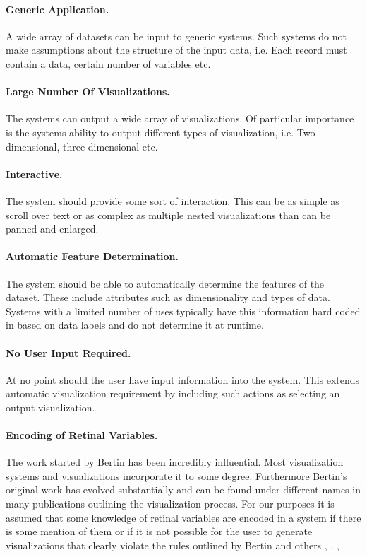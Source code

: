 \documentclass[a4paper, 11pt, titlepage, onehalfspacing]{report}
\begin{document}
\paragraph{Generic Application.} A wide array of datasets can be input to generic systems. Such systems do not make assumptions about the structure of the input data, i.e. Each record must contain a data, certain number of variables etc.

\paragraph{Large Number Of Visualizations.} The systems can output a wide array of visualizations. Of particular importance is the systems ability to output different types of visualization, i.e. Two dimensional, three dimensional etc.

\paragraph{Interactive.} The system should provide some sort of interaction. This can be as simple as scroll over text or as complex as multiple nested visualizations than can be panned and enlarged. 

\paragraph{Automatic Feature Determination.} The system should be able to automatically determine the features of the dataset. These include attributes such as dimensionality and types of data. Systems with a limited number of uses typically have this information hard coded in based on data labels and do not determine it at runtime.

\paragraph{No User Input Required.} At no point should the user have input information into the system. This extends automatic visualization requirement by including such actions as selecting an output visualization.

\paragraph{Encoding of Retinal Variables.}
The work started by Bertin \cite{bertin1973semiologie} has been incredibly influential. Most visualization systems and visualizations incorporate it to some degree. Furthermore Bertin's original work has evolved substantially and can be found under different names in many publications outlining the visualization process. For our purposes it is assumed that some knowledge of retinal variables are encoded in a system if there is some mention of them or if it is not possible for the user to generate visualizations that clearly violate the rules outlined by Bertin and others \cite{card1999readings}, \cite{mazza2009introduction}, \cite{spence2001information}, \cite{cleveland1984graphical}. 
\end{document}
